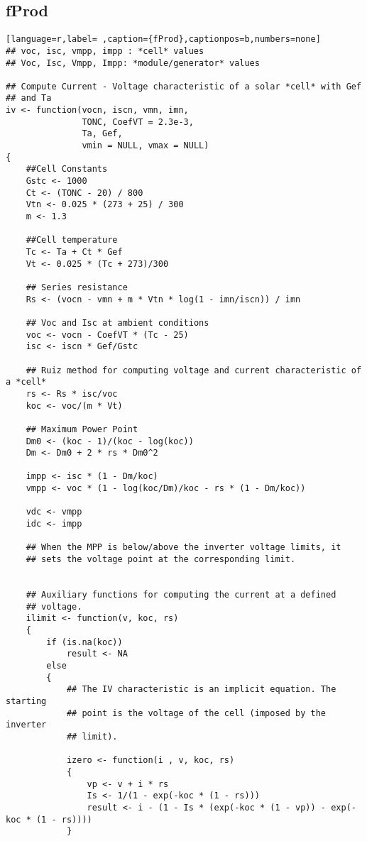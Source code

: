 \subsection{fProd}
\label{sec:org207a236}
\label{subsec:fprod}
\begin{lstlisting}[language=r,label= ,caption={fProd},captionpos=b,numbers=none]
## voc, isc, vmpp, impp : *cell* values
## Voc, Isc, Vmpp, Impp: *module/generator* values

## Compute Current - Voltage characteristic of a solar *cell* with Gef
## and Ta
iv <- function(vocn, iscn, vmn, imn,
               TONC, CoefVT = 2.3e-3,
               Ta, Gef,
               vmin = NULL, vmax = NULL)
{
    ##Cell Constants
    Gstc <- 1000
    Ct <- (TONC - 20) / 800
    Vtn <- 0.025 * (273 + 25) / 300
    m <- 1.3

    ##Cell temperature
    Tc <- Ta + Ct * Gef
    Vt <- 0.025 * (Tc + 273)/300

    ## Series resistance
    Rs <- (vocn - vmn + m * Vtn * log(1 - imn/iscn)) / imn

    ## Voc and Isc at ambient conditions
    voc <- vocn - CoefVT * (Tc - 25)
    isc <- iscn * Gef/Gstc

    ## Ruiz method for computing voltage and current characteristic of a *cell*
    rs <- Rs * isc/voc
    koc <- voc/(m * Vt)

    ## Maximum Power Point
    Dm0 <- (koc - 1)/(koc - log(koc))
    Dm <- Dm0 + 2 * rs * Dm0^2

    impp <- isc * (1 - Dm/koc)
    vmpp <- voc * (1 - log(koc/Dm)/koc - rs * (1 - Dm/koc))

    vdc <- vmpp
    idc <- impp

    ## When the MPP is below/above the inverter voltage limits, it
    ## sets the voltage point at the corresponding limit.


    ## Auxiliary functions for computing the current at a defined
    ## voltage.
    ilimit <- function(v, koc, rs) 
    {
        if (is.na(koc)) 
            result <- NA
        else
        {
            ## The IV characteristic is an implicit equation. The starting
            ## point is the voltage of the cell (imposed by the inverter
            ## limit). 

            izero <- function(i , v, koc, rs)
            {
                vp <- v + i * rs
                Is <- 1/(1 - exp(-koc * (1 - rs)))
                result <- i - (1 - Is * (exp(-koc * (1 - vp)) - exp(-koc * (1 - rs))))
            }


\end{lstlisting}
